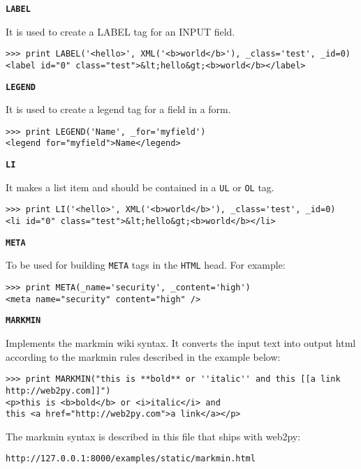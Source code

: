 \documentclass[justified,sixbynine,notoc]{tufte-book}
\def\ft{\small\tt}
\def\inxx#1{\index{#1}}
\begin{document}
\begin{fullwidth}
{\bf {\ft LABEL}}

It is used to create a LABEL tag for an INPUT field.

\inxx{LABEL}
\begin{lstlisting}
>>> print LABEL('<hello>', XML('<b>world</b>'), _class='test', _id=0)
<label id="0" class="test">&lt;hello&gt;<b>world</b></label>
\end{lstlisting}

{\bf {\ft LEGEND}}

It is used to create a legend tag for a field in a form.

\inxx{LEGEND}
\begin{lstlisting}
>>> print LEGEND('Name', _for='myfield')
<legend for="myfield">Name</legend>
\end{lstlisting}

{\bf {\ft LI}}

It makes a list item and should be contained in a {\ft UL} or {\ft OL} tag.

\inxx{LI}
\begin{lstlisting}
>>> print LI('<hello>', XML('<b>world</b>'), _class='test', _id=0)
<li id="0" class="test">&lt;hello&gt;<b>world</b></li>
\end{lstlisting}

{\bf {\ft META}}

To be used for building {\ft META} tags in the {\ft HTML} head. For example:

\inxx{META}
\begin{lstlisting}
>>> print META(_name='security', _content='high')
<meta name="security" content="high" />
\end{lstlisting}

{\bf {\ft MARKMIN}}

Implements the markmin wiki syntax. It converts the input text into output html according to the markmin rules described in the example below:

\inxx{MARKMIN}
\begin{lstlisting}
>>> print MARKMIN("this is **bold** or ''italic'' and this [[a link http://web2py.com]]")
<p>this is <b>bold</b> or <i>italic</i> and
this <a href="http://web2py.com">a link</a></p>
\end{lstlisting}

The markmin syntax is described in this file that ships with web2py:
\begin{lstlisting}[keywords={}]
http://127.0.0.1:8000/examples/static/markmin.html
\end{lstlisting}


\end{fullwidth}
\end{document}
